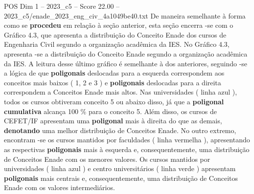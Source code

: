 \begin{textsample}{POS Dim 1 – 2023\_c5 – Score 22.00 – 2023\_c5/enade\_2023\_eng\_civ\_4a1049be40.txt}
De maneira semelhante à forma como se \textbf{procedeu} em relação à seção anterior, esta seção encerra -se com o Gráfico 4.3, que apresenta a distribuição do Conceito Enade dos cursos de Engenharia Civil segundo a organização acadêmica da IES.
No Gráfico 4.3, apresenta -se a distribuição do Conceito Enade segundo a organização acadêmica da IES.
A leitura desse último gráfico é semelhante à dos anteriores, seguindo -se a lógica de que \textbf{poligonais} deslocadas para a esquerda correspondem aos conceitos mais baixos ( 1, 2 e 3 ) e \textbf{poligonais} deslocadas para a direita correspondem a Conceitos Enade mais altos.
Nas universidades ( linha azul ), todos os cursos obtiveram conceito 5 ou abaixo disso, já que a \textbf{poligonal} \textbf{cumulativa} alcança 100 \% para o conceito 5.
Além disso, os cursos de CEFET/IF apresentam uma \textbf{poligonal} mais à direita do que as demais, \textbf{denotando} uma melhor distribuição de Conceitos Enade.
No outro extremo, encontram -se os cursos mantidos por faculdades ( linha vermelha ), apresentando as respectivas \textbf{poligonais} mais à esquerda e, consequentemente, uma distribuição de Conceitos Enade com os menores valores.
Os cursos mantidos por universidades ( linha azul ) e centro universitários ( linha verde ) apresentam \textbf{poligonais} mais centrais e, consequentemente, uma distribuição de Conceitos Enade com os valores intermediários.

\end{textsample}
